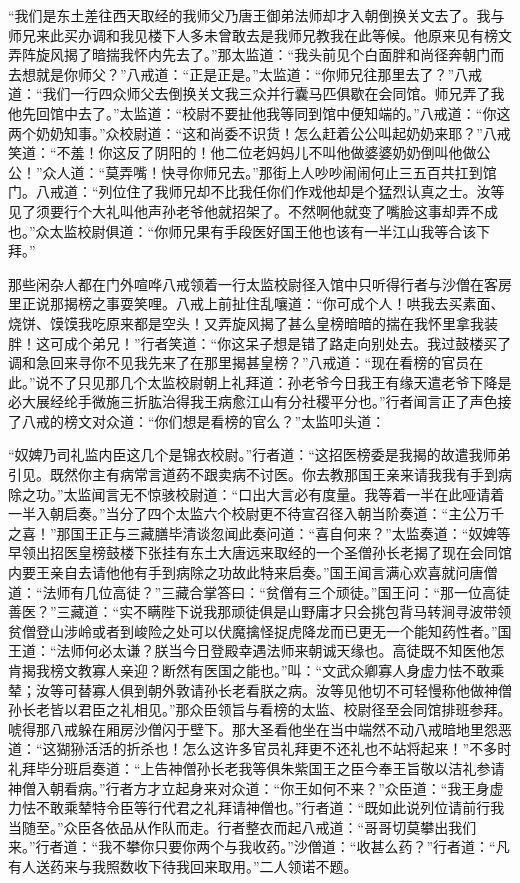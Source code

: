\documentclass[12pt,UTF8]{ctexbook}
\begin{document}
“我们是东土差往西天取经的我师父乃唐王御弟法师却才入朝倒换关文去了。我与师兄来此买办调和我见楼下人多未曾敢去是我师兄教我在此等候。他原来见有榜文弄阵旋风揭了暗揣我怀内先去了。”那太监道：“我头前见个白面胖和尚径奔朝门而去想就是你师父？”八戒道：“正是正是。”太监道：“你师兄往那里去了？”八戒道：“我们一行四众师父去倒换关文我三众并行囊马匹俱歇在会同馆。师兄弄了我他先回馆中去了。”太监道：“校尉不要扯他我等同到馆中便知端的。”八戒道：“你这两个奶奶知事。”众校尉道：“这和尚委不识货！怎么赶着公公叫起奶奶来耶？”八戒笑道：“不羞！你这反了阴阳的！他二位老妈妈儿不叫他做婆婆奶奶倒叫他做公公！”众人道：“莫弄嘴！快寻你师兄去。”那街上人吵吵闹闹何止三五百共扛到馆门。八戒道：“列位住了我师兄却不比我任你们作戏他却是个猛烈认真之士。汝等见了须要行个大礼叫他声孙老爷他就招架了。不然啊他就变了嘴脸这事却弄不成也。”众太监校尉俱道：“你师兄果有手段医好国王他也该有一半江山我等合该下拜。”

那些闲杂人都在门外喧哗八戒领着一行太监校尉径入馆中只听得行者与沙僧在客房里正说那揭榜之事耍笑哩。八戒上前扯住乱嚷道：“你可成个人！哄我去买素面、烧饼、馍馍我吃原来都是空头！又弄旋风揭了甚么皇榜暗暗的揣在我怀里拿我装胖！这可成个弟兄！”行者笑道：“你这呆子想是错了路走向别处去。我过鼓楼买了调和急回来寻你不见我先来了在那里揭甚皇榜？”八戒道：“现在看榜的官员在此。”说不了只见那几个太监校尉朝上礼拜道：孙老爷今日我王有缘天遣老爷下降是必大展经纶手微施三折肱治得我王病愈江山有分社稷平分也。”行者闻言正了声色接了八戒的榜文对众道：“你们想是看榜的官么？”太监叩头道：

“奴婢乃司礼监内臣这几个是锦衣校尉。”行者道：“这招医榜委是我揭的故遣我师弟引见。既然你主有病常言道药不跟卖病不讨医。你去教那国王亲来请我我有手到病除之功。”太监闻言无不惊骇校尉道：“口出大言必有度量。我等着一半在此哑请着一半入朝启奏。”当分了四个太监六个校尉更不待宣召径入朝当阶奏道：“主公万千之喜！”那国王正与三藏膳毕清谈忽闻此奏问道：“喜自何来？”太监奏道：“奴婢等早领出招医皇榜鼓楼下张挂有东土大唐远来取经的一个圣僧孙长老揭了现在会同馆内要王亲自去请他他有手到病除之功故此特来启奏。”国王闻言满心欢喜就问唐僧道：“法师有几位高徒？”三藏合掌答曰：“贫僧有三个顽徒。”国王问：“那一位高徒善医？”三藏道：“实不瞒陛下说我那顽徒俱是山野庸才只会挑包背马转涧寻波带领贫僧登山涉岭或者到峻险之处可以伏魔擒怪捉虎降龙而已更无一个能知药性者。”国王道：“法师何必太谦？朕当今日登殿幸遇法师来朝诚天缘也。高徒既不知医他怎肯揭我榜文教寡人亲迎？断然有医国之能也。”叫：“文武众卿寡人身虚力怯不敢乘辇；汝等可替寡人俱到朝外敦请孙长老看朕之病。汝等见他切不可轻慢称他做神僧孙长老皆以君臣之礼相见。”那众臣领旨与看榜的太监、校尉径至会同馆排班参拜。唬得那八戒躲在厢房沙僧闪于壁下。那大圣看他坐在当中端然不动八戒暗地里怨恶道：“这猢狲活活的折杀也！怎么这许多官员礼拜更不还礼也不站将起来！”不多时礼拜毕分班启奏道：“上告神僧孙长老我等俱朱紫国王之臣今奉王旨敬以洁礼参请神僧入朝看病。”行者方才立起身来对众道：“你王如何不来？”众臣道：“我王身虚力怯不敢乘辇特令臣等行代君之礼拜请神僧也。”行者道：“既如此说列位请前行我当随至。”众臣各依品从作队而走。行者整衣而起八戒道：“哥哥切莫攀出我们来。”行者道：“我不攀你只要你两个与我收药。”沙僧道：“收甚么药？”行者道：“凡有人送药来与我照数收下待我回来取用。”二人领诺不题。
\end{document}
